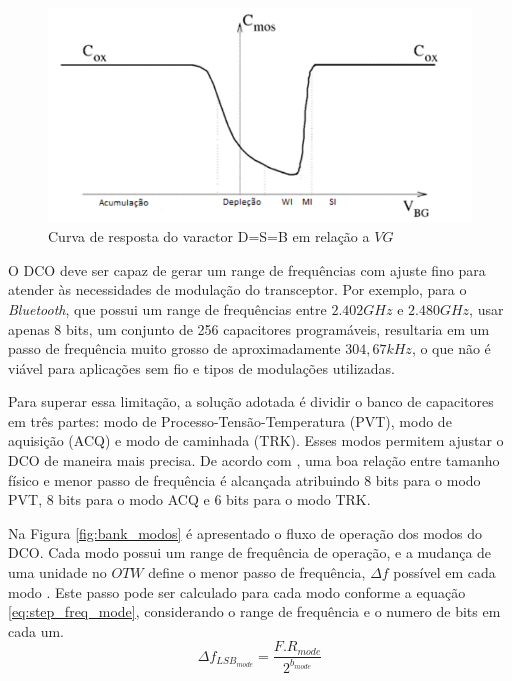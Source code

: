 \begin{figure}[htb]
	\caption{Curva de resposta do varactor D=S=B em relação a $VG$ }
	\begin{center}
		\includegraphics[scale=0.6]{img/curva_COX_vbg.png}
	\end{center}
	\label{fig:curva_COX_vbg}
\end{figure}

O DCO deve ser capaz de gerar um range de frequências com ajuste fino para atender às necessidades de modulação do transceptor. Por exemplo, para o \textit{Bluetooth}, que possui um range de frequências entre $2.402GHz$ e $2.480GHz$, usar apenas 8 bits, um conjunto de 256 capacitores programáveis, resultaria em um passo de frequência muito grosso de aproximadamente $304,67kHz$, o que não é viável para aplicações sem fio e tipos de modulações utilizadas.

Para superar essa limitação, a solução adotada é dividir o banco de capacitores em três partes: modo de Processo-Tensão-Temperatura (PVT), modo de aquisição (ACQ) e modo de caminhada (TRK). Esses modos permitem ajustar o DCO de maneira mais precisa. De acordo com \cite{staszewski2006all}, uma boa relação entre tamanho físico e menor passo de frequência é alcançada atribuindo 8 bits para o modo PVT, 8 bits para o modo ACQ e 6 bits para o modo TRK.

Na Figura \ref{fig:bank_modos} é apresentado o fluxo de operação dos modos do DCO. Cada modo possui um range de frequência de operação, e a mudança de uma unidade no $OTW$ define o menor passo de frequência,  $\Delta f$ possível em cada modo . Este passo pode ser calculado para cada modo conforme a equação \ref{eq:step_freq_mode}, considerando o range de frequência e o numero de bits em cada um. 
\begin{equation}
	\Delta f_{LSB_{mode}} = \frac{F.R_{mode}}{2^{b_{mode}}}
	\label{eq:step_freq_mode}
\end{equation}

